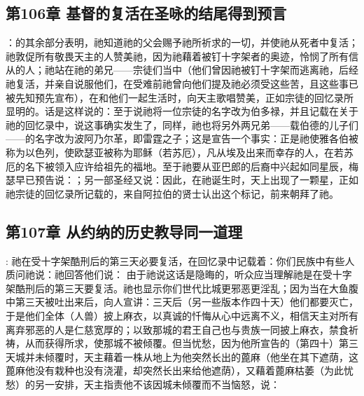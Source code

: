 
\subsection{第106章 基督的复活在圣咏的结尾得到预言}

：的其余部分表明，祂知道祂的父会赐予祂所祈求的一切，并使祂从死者中复活；祂敦促所有敬畏天主的人赞美祂，因为祂藉着被钉十字架者的奥迹，怜悯了所有信从的人；祂站在祂的弟兄——宗徒们当中（他们曾因祂被钉十字架而逃离祂，后经祂复活，并亲自说服他们，在受难前祂曾向他们提及祂必须受这些苦，且这些事已被先知预先宣布），在和他们一起生活时，向天主歌唱赞美，正如宗徒的回忆录所显明的。话是这样说的：至于说祂将一位宗徒的名字改为伯多禄，并且记载在关于祂的回忆录中，说这事确实发生了，同样，祂也将另外两兄弟——载伯德的儿子们——的名字改为波阿乃尔革，即雷霆之子；这是宣告一个事实：正是祂使雅各伯被称为以色列，使欧瑟亚被称为耶稣（若苏厄），凡从埃及出来而幸存的人，在若苏厄的名下被领入应许给祖先的福地。至于祂要从亚巴郎的后裔中兴起如同星辰，梅瑟早已预告说：；另一部圣经又说：因此，在祂诞生时，天上出现了一颗星，正如祂宗徒的回忆录所记载的，来自阿拉伯的贤士认出这个标记，前来朝拜了祂。\par


\subsection{第107章 从约纳的历史教导同一道理}

: 祂在受十字架酷刑后的第三天必要复活，在回忆录中记载着：你们民族中有些人质问祂说：祂回答他们说： 由于祂说这话是隐晦的，听众应当理解祂是在受十字架酷刑后的第三天要复活。祂也显示你们世代比城更邪恶更淫乱；因为当在大鱼腹中第三天被吐出来后，向人宣讲：三天后（另一些版本作四十天）他们都要灭亡，于是他们全体（人兽）披上麻衣，以真诚的忏悔从心中远离不义，相信天主对所有离弃邪恶的人是仁慈宽厚的；以致那城的君王自己也与贵族一同披上麻衣，禁食祈祷，从而获得所求，使那城不被倾覆。但当忧愁，因为他所宣告的（第四十）第三天城并未倾覆时，天主藉着一株从地上为他突然长出的蓖麻（他坐在其下遮荫，这蓖麻他没有栽种也没有浇灌，却突然长出来给他遮荫），又藉着蓖麻枯萎（为此忧愁）的另一安排，天主指责他不该因城未倾覆而不当恼怒，说：\par

